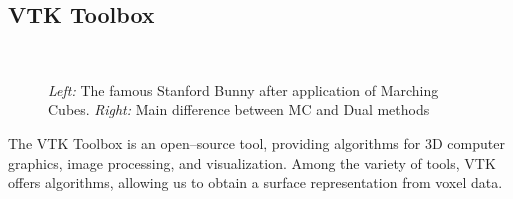 \subsection{VTK Toolbox}
\begin{figure}
\centering
   \\
   \caption{\textit{Left:} The famous Stanford Bunny after application of Marching Cubes. \textit{Right:} Main difference between MC and Dual methods }
   \label{fig:bunny_MCDC}
\end{figure}

The VTK Toolbox is an open--source tool, providing algorithms for 3D computer graphics, image processing, and visualization. Among the variety of tools, VTK offers algorithms, allowing us to obtain a surface representation from voxel data. 

